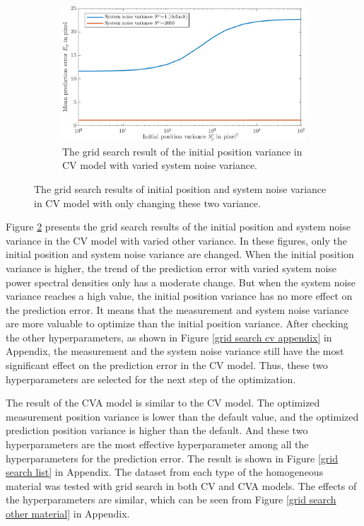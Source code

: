 \begin{figure}[htbp]
    \ContinuedFloat
    \centering
	\begin{subfigure}[t]{0.8\textwidth}
		\includegraphics[width=\textwidth]{figures/KF/inicov with precov cv.png}
		\caption{The grid search result of the initial position variance in CV model with varied system noise variance.}
		\label{grid search different default2}
	\end{subfigure}
	\caption{The grid search results of initial position and system noise variance in CV model with only changing these two variance.}
	\label{grid search different default}
\end{figure} 
Figure \ref{grid search different default} presents the grid search results of the initial position and system noise variance in the CV model with varied other variance. In these figures, only the initial position and system noise variance are changed. When the initial position variance is higher, the trend of the prediction error with varied system noise power spectral densities only has a moderate change. But when the system noise variance reaches a high value, the initial position variance has no more effect on the prediction error. It means that the measurement and system noise variance are more valuable to optimize than the initial position variance. After checking the other hyperparameters, as shown in Figure \ref{grid search cv appendix} in Appendix, the measurement and the system noise variance still have the most significant effect on the prediction error in the CV model. Thus, these two hyperparameters are selected for the next step of the optimization.

The result of the CVA model is similar to the CV model. The optimized measurement position variance is lower than the default value, and the optimized prediction position variance is higher than the default. And these two hyperparameters are the most effective hyperparameter among all the hyperparameters for the prediction error. The result is shown in Figure \ref{grid search list} in Appendix. The dataset from each type of the homogeneous material was tested with grid search in both CV and CVA models. The effects of the hyperparameters are similar, which can be seen from Figure \ref{grid search other material} in Appendix. 

